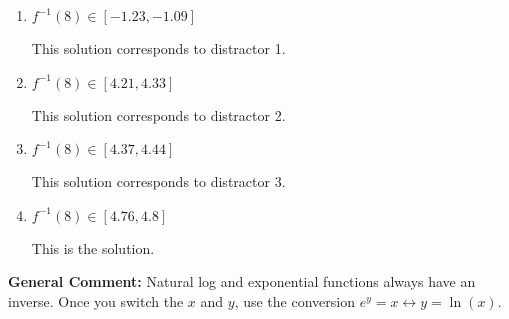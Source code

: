 \documentclass{extbook}[14pt]
\begin{document}
\begin{enumerate}
{\begin{enumerate}[label=\Alph*.]
 This solution corresponds to distractor 4.
\item \( f^{-1}(8) \in [-1.23, -1.09] \)

 This solution corresponds to distractor 1.
\item \( f^{-1}(8) \in [4.21, 4.33] \)

 This solution corresponds to distractor 2.
\item \( f^{-1}(8) \in [4.37, 4.44] \)

 This solution corresponds to distractor 3.
\item \( f^{-1}(8) \in [4.76, 4.8] \)

 This is the solution.
\end{enumerate}

\textbf{General Comment:} Natural log and exponential functions always have an inverse. Once you switch the $x$ and $y$, use the conversion $ e^y = x \leftrightarrow y=\ln(x)$.
}
\end{enumerate}
\end{document}
